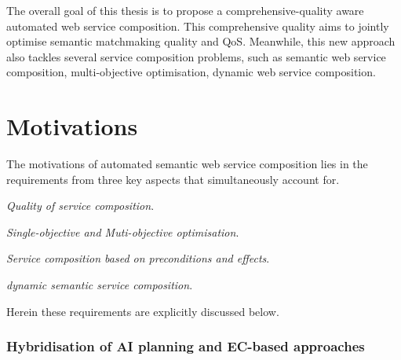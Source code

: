 The overall goal of this thesis is to propose a comprehensive-quality aware automated web service composition. This comprehensive quality aims to jointly optimise semantic matchmaking quality and QoS. Meanwhile, this new approach also tackles several service composition problems, such as semantic web service composition, multi-objective optimisation, dynamic web service composition.

\section{Motivations}
The motivations of automated semantic web service composition lies in the requirements from three key aspects that simultaneously account for. 
\begin{enumerate*}
 \item \emph{Quality of service composition}.
 \item \emph{Single-objective and Muti-objective optimisation}.
 \item \emph{Service composition based on preconditions and effects}.
 \item \emph{dynamic semantic service composition}.
\end{enumerate*}
Herein these requirements are explicitly discussed below. 
\subsubsection{Hybridisation of AI planning and EC-based approaches}



